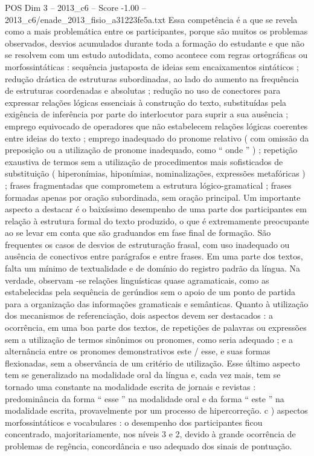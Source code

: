 \begin{textsample}{POS Dim 3 – 2013\_c6 – Score -1.00 – 2013\_c6/enade\_2013\_fisio\_a31223fe5a.txt}
Essa competência é a que se revela como a mais problemática entre os participantes, porque são muitos os problemas observados, desvios acumulados durante toda a formação do estudante e que não se resolvem com um estudo autodidata, como acontece com regras ortográficas ou morfossintáticas : sequência justaposta de ideias sem encaixamentos sintáticos ; redução drástica de estruturas subordinadas, ao lado do aumento na frequência de estruturas coordenadas e absolutas ; redução no uso de conectores para expressar relações lógicas essenciais à construção do texto, substituídas pela exigência de inferência por parte do interlocutor para suprir a sua ausência ; emprego equivocado de operadores que não estabelecem relações lógicas coerentes entre ideias do texto ; emprego inadequado do pronome relativo ( com omissão da preposição ou a utilização de pronome inadequado, como “ onde ” ) ; repetição exaustiva de termos sem a utilização de procedimentos mais sofisticados de substituição ( hiperonímias, hiponímias, nominalizações, expressões metafóricas ) ; frases fragmentadas que comprometem a estrutura lógico-gramatical ; frases formadas apenas por oração subordinada, sem oração principal.
Um importante aspecto a destacar é o baixíssimo desempenho de uma parte dos participantes em relação à estrutura formal do texto produzido, o que é extremamente preocupante ao se levar em conta que são graduandos em fase final de formação.
São frequentes os casos de desvios de estruturação frasal, com uso inadequado ou ausência de conectivos entre parágrafos e entre frases.
Em uma parte dos textos, falta um mínimo de textualidade e de domínio do registro padrão da língua.
Na verdade, observam -se relações linguísticas quase agramaticais, como as estabelecidas pela sequência de gerúndios sem o apoio de um ponto de partida para a organização das informações gramaticais e semânticas.
Quanto à utilização dos mecanismos de referenciação, dois aspectos devem ser destacados : a ocorrência, em uma boa parte dos textos, de repetições de palavras ou expressões sem a utilização de termos sinônimos ou pronomes, como seria adequado ; e a alternância entre os pronomes demonstrativos este / esse, e suas formas flexionadas, sem a observância de um critério de utilização.
Esse último aspecto tem se generalizado na modalidade oral da língua e, cada vez mais, tem se tornado uma constante na modalidade escrita de jornais e revistas : predominância da forma “ esse ” na modalidade oral e da forma “ este ” na modalidade escrita, provavelmente por um processo de hipercorreção. c ) aspectos morfossintáticos e vocabulares : o desempenho dos participantes ficou concentrado, majoritariamente, nos níveis 3 e 2, devido à grande ocorrência de problemas de regência, concordância e uso adequado dos sinais de pontuação.

\end{textsample}
